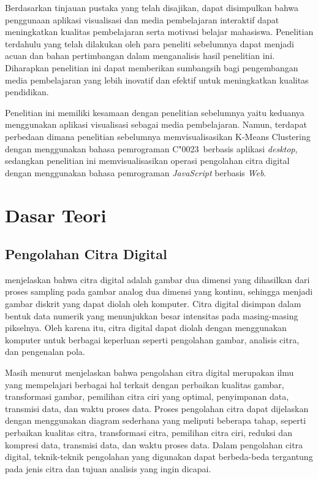 Berdasarkan tinjauan pustaka yang telah disajikan, dapat disimpulkan bahwa penggunaan aplikasi visualisasi dan media pembelajaran interaktif dapat meningkatkan kualitas pembelajaran serta motivasi belajar mahasiswa. Penelitian terdahulu yang telah dilakukan oleh para peneliti sebelumnya dapat menjadi acuan dan bahan pertimbangan dalam menganalisis hasil penelitian ini. Diharapkan penelitian ini dapat memberikan sumbangsih bagi pengembangan media pembelajaran yang lebih inovatif dan efektif untuk meningkatkan kualitas pendidikan.

Penelitian ini memiliki kesamaan dengan penelitian sebelumnya yaitu keduanya menggunakan aplikasi visualisasi sebagai media pembelajaran. Namun, terdapat perbedaan dimana penelitian sebelumnya memvisualisasikan K-Means Clustering dengan menggunakan bahasa pemrograman C\char"0023\ berbasis aplikasi \textit{desktop}, sedangkan penelitian ini memvisualisasikan operasi pengolahan citra digital dengan menggunakan bahasa pemrograman \textit{JavaScript} berbasis \textit{Web}.
\section{Dasar Teori}
\subsection{Pengolahan Citra Digital}
\textcite{munantri2020aplikasi} menjelaskan bahwa citra digital adalah gambar dua dimensi yang dihasilkan dari proses sampling pada gambar analog dua dimensi yang kontinu, sehingga menjadi gambar diskrit yang dapat diolah oleh komputer. Citra digital disimpan dalam bentuk data numerik yang menunjukkan besar intensitas pada masing-masing pikselnya. Oleh karena itu, citra digital dapat diolah dengan menggunakan komputer untuk berbagai keperluan seperti pengolahan gambar, analisis citra, dan pengenalan pola.

Masih menurut \textcite{munantri2020aplikasi} menjelaskan bahwa pengolahan citra digital merupakan ilmu yang mempelajari berbagai hal terkait dengan perbaikan kualitas gambar, transformasi gambar, pemilihan citra ciri yang optimal, penyimpanan data, transmisi data, dan waktu proses data. Proses pengolahan citra dapat dijelaskan dengan menggunakan diagram sederhana yang meliputi beberapa tahap, seperti perbaikan kualitas citra, transformasi citra, pemilihan citra ciri, reduksi dan kompresi data, transmisi data, dan waktu proses data. Dalam pengolahan citra digital, teknik-teknik pengolahan yang digunakan dapat berbeda-beda tergantung pada jenis citra dan tujuan analisis yang ingin dicapai.


